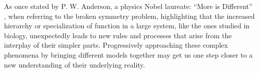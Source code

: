 As once stated by P. W. Anderson, a physics Nobel laureate: \enquote{More is Different} \cite{Anderson1972-og}, when referring to the broken symmetry problem, highlighting that the increased hierarchy or specialization of function in a large system, like the ones studied in biology, unexpectedly leads to new rules and processes that arise from the interplay of their simpler parts. Progressively approaching these complex phenomena by bringing different models together may get us one step closer to a new understanding of their underlying reality.  




%



% 
%
%